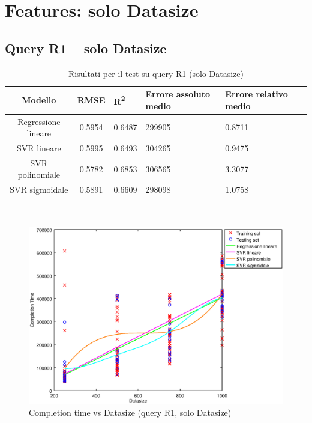 \documentclass[a4paper,11pt]{article}
\begin{document}
\newpage
\section{Features: solo Datasize}
\subsection{Query R1 -- solo Datasize}

\begin{table}[bhpt]
	\centering
	\begin{adjustbox}{center}
		\begin{tabular}{c | c M{1.2cm} M{2.5cm} M{2.5cm} M{1.8cm}}
			Modello & RMSE & R\textsuperscript{2} & Errore assoluto medio & Errore relativo medio \tabularnewline
			\hline
			Regressione lineare & 0.5954 & 0.6487 & 299905 & 0.8711 \\
			SVR lineare & 0.5995 & 0.6493 & 304265 & 0.9475 \\
			SVR polinomiale & 0.5782 & 0.6853 & 306565 & 3.3077 \\
			SVR sigmoidale & 0.5891 & 0.6609 & 298098 & 1.0758 \\
		\end{tabular}
	\end{adjustbox}
	\\
	\caption{Risultati per il test su query R1 (solo Datasize)}
	\label{table_R1_datasize}
\end{table}

\begin {figure}[hbtp]
\centering
\includegraphics[width=\textwidth]{output/R1_SOLO_DATASIZE/plot_R1.eps}
\caption {Completion time vs Datasize (query R1, solo Datasize)}
\end {figure}
\end{document}
